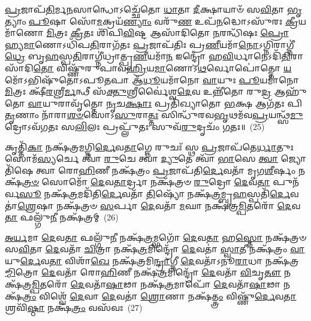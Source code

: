 {\anuvakamend[{\-\ul{𑌅}\-𑌗𑍍𑌨𑌿𑌨𑍈\-\ul{𑌕𑌾}\-𑌨𑍍𑌨𑌪᳴\-\ul{𑌞𑍍𑌚𑌾}\-𑌶𑌤𑍍}]}%

\-\ul{𑌪𑍍𑌰}\-𑌜𑌾𑌪᳴\-\ul{𑌤𑌿}\-𑌰𑍍𑌮\-\ul{𑌨}\-𑌸𑌾𑌨𑍍𑌧𑍋\-𑌽𑌚𑍍𑌛𑍇᳴𑌤𑍋 \ul{𑌧𑌾}\-𑌤𑌾 \ul{𑌦𑍀}\-𑌕𑍍𑌷𑌾𑌯𑌾𑍞᳴ 𑌸\-\ul{𑌵𑌿}\-𑌤𑌾 \ul{𑌭𑍃}\-𑌤𑍍𑌯𑌾𑌂 \ul{𑌪𑍂}\-𑌷𑌾 𑌸𑍋᳴\-\ul{𑌮}\-𑌕𑍍𑌰𑌯᳴\-\ul{𑌣𑍍𑌯𑌾𑌂} 𑌵𑌰𑍁᳴\-\ul{𑌣} 𑌉𑌪᳴\-\ul{𑌨}\-𑌦𑍍𑌧𑍋\-𑌽𑌸𑍁᳴𑌰𑌃 \ul{𑌕𑍍𑌰𑍀}\-𑌯𑌮𑌾᳴𑌣𑍋 \ul{𑌮𑌿}\-𑌤𑍍𑌰𑌃 \ul{𑌕𑍍𑌰𑍀}\-𑌤𑌃 𑌶𑌿᳴𑌪𑌿\-\ul{𑌵𑌿}\-𑌷𑍍𑌟 𑌆𑌸𑌾᳴𑌦𑌿𑌤𑍋 \ul{𑌨}\-𑌰𑌨𑍍𑌧𑌿᳴𑌷𑌃 \ul{𑌪𑍍𑌰𑍋}\-𑌹𑍍𑌯\-\ul{𑌮𑌾}\-𑌣𑍋\-𑌽𑌧𑌿᳴𑌪\-\ul{𑌤𑌿}\-𑌰𑌾𑌗᳴𑌤𑌃 \ul{𑌪𑍍𑌰}\-𑌜𑌾𑌪᳴𑌤𑌿𑌃 𑌪𑍍𑌰\-\ul{𑌣𑍀}\-𑌯𑌮𑌾᳴\-\ul{𑌨𑍋}\-\-𑌽𑌗𑍍𑌨𑌿𑌰𑌾𑌗𑍍𑌨𑍀॑\-\ul{𑌧𑍍𑌰𑍇} 𑌬𑍃\-\ul{𑌹}\-𑌸𑍍𑌪\-\ul{𑌤𑌿}\-𑌰𑌾𑌗𑍍𑌨𑍀॑𑌧𑍍𑌰𑌾𑌤𑍍𑌪𑍍𑌰\-\ul{𑌣𑍀}\-𑌯𑌮𑌾᳴\-\ul{𑌨} 𑌇𑌨𑍍𑌦𑍍𑌰𑍋᳴ 𑌹\-\ul{𑌵𑌿}\-𑌰𑍍𑌧𑌾𑌨𑍇\-𑌽𑌦𑌿᳴\-\ul{𑌤𑌿}\-𑌰𑌾𑌸𑌾᳴𑌦𑌿\-\ul{𑌤𑍋} 𑌵𑌿𑌷𑍍𑌣𑍁᳴𑌰𑍁𑌪𑌾𑌵\-\ul{𑌹𑍍𑌰𑌿}\-𑌯\-\ul{𑌮𑌾}\-𑌣𑍋\-𑌽\-\ul{𑌥}\-𑌰𑍍𑌵𑍋𑌪𑍋॑𑌤𑍍𑌤𑍋 \ul{𑌯}\-𑌮𑍋᳴\-𑌽𑌭𑌿𑌷𑍁᳴𑌤𑍋\-𑌽𑌪𑍂\-\ul{𑌤}\-𑌪𑌾 𑌆᳴\-\ul{𑌧𑍂}\-𑌯𑌮𑌾᳴𑌨𑍋 \ul{𑌵𑌾}\-𑌯𑍁𑌃 \ul{𑌪𑍂}\-𑌯𑌮𑌾᳴𑌨𑍋 \ul{𑌮𑌿}\-𑌤𑍍𑌰𑌃 𑌕𑍍𑌷𑍀᳴\-\ul{𑌰}\-𑌶𑍍𑌰𑍀\-\ul{𑌰𑍍𑌮}\-𑌨𑍍𑌥𑍀 𑌸᳴\-\ul{𑌕𑍍𑌤𑍁}\-𑌶𑍍𑌰𑍀𑌰𑍍𑌵𑍈॑𑌶𑍍𑌵\-\ul{𑌦𑍇}\-𑌵 𑌉𑌨𑍍𑌨𑍀᳴𑌤𑍋 𑌰𑍁\-\ul{𑌦𑍍𑌰} 𑌆𑌹𑍁᳴𑌤𑍋 \ul{𑌵𑌾}\-𑌯𑍁𑌰𑌾𑌵𑍃᳴𑌤𑍍𑌤𑍋 \ul{𑌨𑍃}\-𑌚\-\ul{𑌕𑍍𑌷𑌾𑌃} 𑌪𑍍𑌰𑌤𑌿᳴𑌖𑍍𑌯𑌾𑌤𑍋 \ul{𑌭}\-𑌕𑍍𑌷 𑌆𑌗᳴𑌤𑌃 𑌪𑌿\-\ul{𑌤𑍃}\-𑌣𑌾𑌂 𑌨𑌾᳴𑌰𑌾\-\ul{𑌶}\-\-\ul{𑍞}\-𑌸𑍋\-𑌽\-\ul{𑌸𑍁}\-𑌰𑌾\-\ul{𑌤𑍍𑌤𑌃} 𑌸𑌿𑌨𑍍𑌧𑍁᳴𑌰𑌵\-\ul{𑌭𑍃}\-𑌥𑌮᳴𑌵\-\ul{𑌪𑍍𑌰}\-𑌯𑌨𑍍𑌥𑍍𑌸᳴\-\ul{𑌮𑍁}\-𑌦𑍍𑌰𑍋\-𑌽𑌵᳴𑌗𑌤𑌃 𑌸\-\ul{𑌲𑌿}\-𑌲𑌃 𑌪𑍍𑌰𑌪𑍍𑌲𑍁᳴𑌤𑌃 𑌸𑍁𑌵᳴\-\ul{𑌰𑍁}\-𑌦𑍃𑌚𑌂᳴ \ul{𑌗}\-𑌤𑌃॥~(25)

{\anuvakamend[{\-\ul{𑌰𑍁}\-𑌦𑍍𑌰 𑌏𑌕᳴𑌵𑌿𑍞𑌶𑌤𑌿𑌶𑍍𑌚}]}%

𑌕𑍃𑌤𑍍𑌤𑌿᳴\-\ul{𑌕𑌾} 𑌨𑌕𑍍𑌷᳴𑌤𑍍𑌰\-\ul{𑌮}\-𑌗𑍍𑌨𑌿\-\ul{𑌰𑍍𑌦𑍇}\-𑌵\-\ul{𑌤𑌾}\-𑌗𑍍𑌨𑍇 𑌰𑍁𑌚𑌃᳴ 𑌸𑍍𑌥 \ul{𑌪𑍍𑌰}\-𑌜𑌾𑌪᳴𑌤𑍇\-\ul{𑌰𑍍𑌧𑌾}\-𑌤𑍁𑌃 𑌸𑍋𑌮᳴\-\ul{𑌸𑍍𑌯}\-𑌰𑍍𑌚𑍇 𑌤𑍍𑌵𑌾᳴ \ul{𑌰𑍁}\-𑌚𑍇 𑌤𑍍𑌵𑌾॑ \ul{𑌦𑍍𑌯𑍁}\-𑌤𑍇 𑌤𑍍𑌵𑌾᳴ \ul{𑌭𑌾}\-𑌸𑍇 \ul{𑌤𑍍𑌵𑌾} 𑌜𑍍𑌯𑍋𑌤𑌿᳴𑌷𑍇 𑌤𑍍𑌵𑌾 𑌰𑍋\-\ul{𑌹𑌿}\-𑌣𑍀 𑌨𑌕𑍍𑌷᳴𑌤𑍍𑌰𑌂 \ul{𑌪𑍍𑌰}\-𑌜𑌾𑌪᳴𑌤𑌿\-\ul{𑌰𑍍𑌦𑍇}\-𑌵𑌤𑌾᳴ 𑌮𑍃𑌗\-\ul{𑌶𑍀}\-𑌰𑍍\mbox{}𑌷𑌂 𑌨𑌕𑍍𑌷᳴\-\ul{𑌤𑍍𑌰}\-\-\ul{𑍞} 𑌸𑍋𑌮𑍋᳴ \ul{𑌦𑍇}\-𑌵\-\ul{𑌤𑌾}\-𑌰𑍍𑌦𑍍𑌰𑌾 𑌨𑌕𑍍𑌷᳴𑌤𑍍𑌰𑍞 \ul{𑌰𑍁}\-𑌦𑍍𑌰𑍋 \ul{𑌦𑍇}\-𑌵\-\ul{𑌤𑌾} 𑌪𑍁𑌨᳴𑌰𑍍𑌵\-\ul{𑌸𑍂} 𑌨𑌕𑍍𑌷᳴\-\ul{𑌤𑍍𑌰}\-𑌮𑌦𑌿᳴𑌤𑌿\-\-\ul{𑌰𑍍𑌦𑍇}\-𑌵𑌤𑌾᳴ \ul{𑌤𑌿}\-𑌷𑍍𑌯𑍋᳴ 𑌨𑌕𑍍𑌷᳴\-\ul{𑌤𑍍𑌰}\-𑌮𑍍𑌬𑍃\-\ul{𑌹}\-𑌸𑍍𑌪𑌤𑌿᳴\-\ul{𑌰𑍍𑌦𑍇}\-𑌵𑌤𑌾॑\-\ul{𑌶𑍍𑌰𑍇}\-𑌷𑌾 𑌨𑌕𑍍𑌷᳴𑌤𑍍𑌰𑍞 \ul{𑌸}\-𑌰𑍍𑌪𑌾 \ul{𑌦𑍇}\-𑌵𑌤𑌾᳴ \ul{𑌮}\-𑌘𑌾 𑌨𑌕𑍍𑌷᳴𑌤𑍍𑌰\-\ul{𑌮𑍍𑌪𑌿}\-𑌤𑌰𑍋᳴ \ul{𑌦𑍇}\-𑌵\-\ul{𑌤𑌾} 𑌫𑌲𑍍𑌗𑍁᳴\-\ul{𑌨𑍀} 𑌨𑌕𑍍𑌷᳴𑌤𑍍𑌰𑌮𑍍~(26)

\-\ul{𑌅}\-\-\ul{𑌰𑍍𑌯}\-𑌮𑌾 \ul{𑌦𑍇}\-𑌵\-\ul{𑌤𑌾} 𑌫𑌲𑍍𑌗𑍁᳴\-\ul{𑌨𑍀} 𑌨𑌕𑍍𑌷᳴\-\ul{𑌤𑍍𑌰}\-𑌮𑍍𑌭𑌗𑍋᳴ \ul{𑌦𑍇}\-𑌵\-\ul{𑌤𑌾} 𑌹\-\ul{𑌸𑍍𑌤𑍋} 𑌨𑌕𑍍𑌷᳴𑌤𑍍𑌰𑍞 𑌸\-\ul{𑌵𑌿}\-𑌤𑌾 \ul{𑌦𑍇}\-𑌵𑌤𑌾᳴ \ul{𑌚𑌿}\-𑌤𑍍𑌰𑌾 𑌨𑌕𑍍𑌷᳴\-\ul{𑌤𑍍𑌰}\-𑌮𑌿𑌨𑍍𑌦𑍍𑌰𑍋᳴ \ul{𑌦𑍇}\-𑌵𑌤𑌾॑ \ul{𑌸𑍍𑌵𑌾}\-𑌤𑍀 𑌨𑌕𑍍𑌷᳴𑌤𑍍𑌰𑌂 \ul{𑌵𑌾}\-𑌯𑍁\-\ul{𑌰𑍍𑌦𑍇}\-𑌵\-\ul{𑌤𑌾} 𑌵𑌿𑌶𑌾᳴\-\ul{𑌖𑍇} 𑌨𑌕𑍍𑌷᳴𑌤𑍍𑌰𑌮𑌿\-\ul{𑌨𑍍𑌦𑍍𑌰𑌾}\-𑌗𑍍𑌨𑍀 \ul{𑌦𑍇}\-𑌵𑌤𑌾᳴\-𑌽𑌨𑍂\-\ul{𑌰𑌾}\-𑌧𑌾 𑌨𑌕𑍍𑌷᳴𑌤𑍍𑌰\-\ul{𑌮𑍍𑌮𑌿}\-𑌤𑍍𑌰𑍋 \ul{𑌦𑍇}\-𑌵𑌤𑌾᳴ 𑌰𑍋\-\ul{𑌹𑌿}\-𑌣𑍀 𑌨𑌕𑍍𑌷᳴\-\ul{𑌤𑍍𑌰}\-𑌮𑌿𑌨𑍍𑌦𑍍𑌰𑍋᳴ \ul{𑌦𑍇}\-𑌵𑌤𑌾᳴ \ul{𑌵𑌿}\-𑌚𑍃\-\ul{𑌤𑍗} 𑌨𑌕𑍍𑌷᳴𑌤𑍍𑌰\-\ul{𑌮𑍍𑌪𑌿}\-𑌤𑌰𑍋᳴ \ul{𑌦𑍇}\-𑌵𑌤𑌾᳴\-\ul{𑌷𑌾}\-𑌢𑌾 𑌨𑌕𑍍𑌷᳴\-\ul{𑌤𑍍𑌰}\-𑌮𑌾𑌪𑍋᳴ \ul{𑌦𑍇}\-𑌵𑌤𑌾᳴\-\ul{𑌷𑌾}\-𑌢𑌾 𑌨𑌕𑍍𑌷᳴\-\ul{𑌤𑍍𑌰𑌂} 𑌵𑌿𑌶𑍍𑌵𑍇᳴ \ul{𑌦𑍇}\-𑌵𑌾 \ul{𑌦𑍇}\-𑌵𑌤𑌾॑ \ul{𑌶𑍍𑌰𑍋}\-𑌣𑌾 𑌨𑌕𑍍𑌷᳴\-\ul{𑌤𑍍𑌤𑍍𑌰𑌂} 𑌵𑌿𑌷𑍍𑌣𑍁᳴\-\ul{𑌰𑍍𑌦𑍇}\-𑌵\-\ul{𑌤𑌾} 𑌶𑍍𑌰𑌵𑌿᳴\-\ul{𑌷𑍍𑌠𑌾} 𑌨𑌕𑍍𑌷᳴\-\ul{𑌤𑍍𑌰𑌂} 𑌵𑌸᳴𑌵𑌃~(27)

